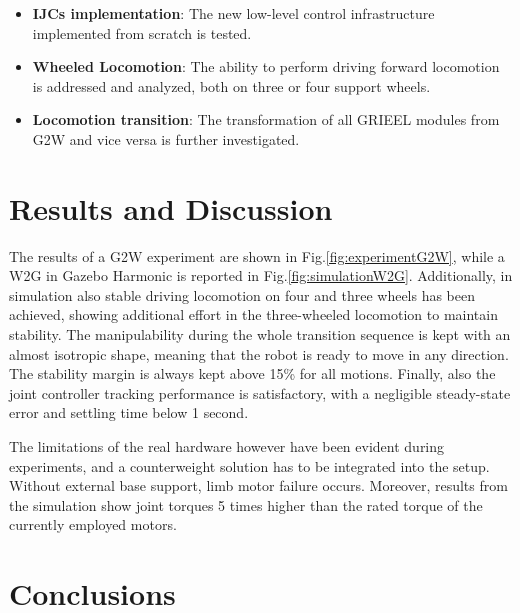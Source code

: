 \documentclass[11pt,a4paper,twocolumn]{article}
\begin{document}
\begin{itemize}
    \setlength\itemsep{-0.7pt} 
    \item \textbf{IJCs implementation}: The new low-level control infrastructure implemented from scratch is tested.
    \item \textbf{Wheeled Locomotion}: The ability to perform driving forward locomotion is addressed and analyzed, both on three or four support wheels.
    \item \textbf{Locomotion transition}: The transformation of all GRIEEL modules from G2W and vice versa is further investigated.
\end{itemize}
\section{Results and Discussion}
\label{sec:results}
The results of a G2W experiment are shown in Fig.\ref{fig:experimentG2W}, while a W2G in Gazebo Harmonic is reported in Fig.\ref{fig:simulationW2G}. Additionally, in simulation also stable driving locomotion on four and three wheels has been achieved, showing additional effort in the three-wheeled locomotion to maintain stability.
The manipulability during the whole transition sequence is kept with an almost isotropic shape, meaning that the robot is ready to move in any direction. The stability margin is always kept above 15\% for all motions. Finally, also the joint controller tracking performance is satisfactory, with a negligible steady-state error and settling time below 1 second.

The limitations of the real hardware however have been evident during experiments, and a counterweight solution has to be integrated into the setup. Without external base support, limb motor failure occurs. Moreover, results from the simulation show joint torques 5 times higher than the rated torque of the currently employed motors. 



\section{Conclusions}
\label{sec:conclusion}
\end{document}
